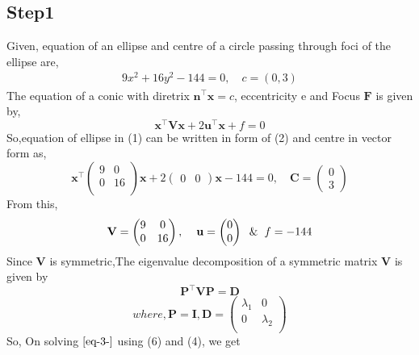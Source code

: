 \documentclass[journal,10pt,twocolumn]{article}
\let\vec\mathbf
\newcommand{\myvec}[1]{\ensuremath{\begin{pmatrix}#1\end{pmatrix}}}
\begin{document}
\subsection*{Step1}
Given, equation of an ellipse and centre of a circle passing through foci of the ellipse are,
\begin{align}
9x^2+16y^2-144=0,\hspace{1em}c=(0,3)
\end{align}
The equation of a conic with diretrix $\vec{n}^{\top}\vec{x} = c$, eccentricity e and Focus $\vec{F}$ is given by,
\begin{equation}
\vec{x}^{\top}\vec{V}\vec{x}+2\vec{u}^{\top}\vec{x}+f=0
\label{eq-1-}
\end{equation}
So,equation of ellipse in (1) can be written in form of (2) and centre in vector form as,
\begin{equation}
\vec{x}^{\top}\begin{pmatrix} 
	9 & 0 \\
	0 & 16 \\
	\end{pmatrix}\vec{x}+2\myvec{0&0}\vec{x}-144=0,\hspace{1em}\vec{C}=\myvec{0\\3}
\end{equation}
From this,
\begin{equation}
\vec{V} = \begin{pmatrix} 
	9 & 0 \\
	0 & 16 \\
	\end{pmatrix}, \hspace{4mm} \vec{u} = \myvec{0 \\ 0} \hspace{2mm} \& \hspace{2mm} f = -144
\label{eq-2-}
\end{equation}
Since $\vec{V}$ is symmetric,The eigenvalue decomposition of a symmetric matrix $\vec{V}$ is given by
\begin{equation}
\vec{P}^{\top}\vec{V}\vec{P} = \vec{D}   
\label{eq-3-}
\end{equation}
\begin{equation}
where, \vec{P}=\vec{I},\vec{D} = \begin{pmatrix} 
	\lambda_1 & 0 \\
	0 & \lambda_2 \\
	\end{pmatrix} 
\label{eq-4-}
\end{equation}
So, On solving $\eqref{eq-3-}$ using (6) and (4), we get
\end{document}
